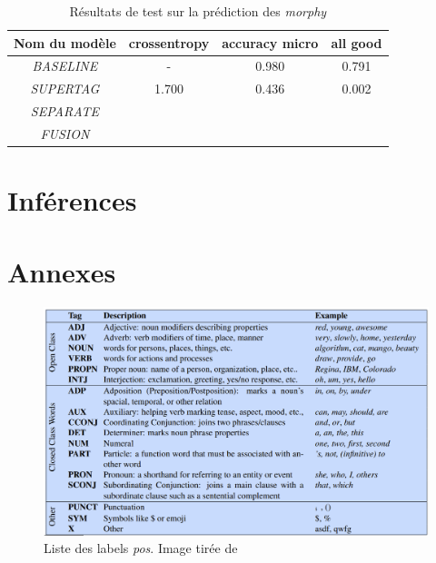 \documentclass[a4paper]{article}
\begin{document}


\begin{table}[H]
    \centering
    \begin{tabular}{|c|c|c|c|}
        \hline
         Nom du modèle & crossentropy & accuracy micro & all good\\
         \hline
         \textit{BASELINE}& - & 0.980 & 0.791 \\
         \hline
         \textit{SUPERTAG}& 1.700 & 0.436 & 0.002\\
         \hline
         \textit{SEPARATE}&  &  & \\
         \hline
         \textit{FUSION}&  &  & \\
         \hline
    \end{tabular}
    \caption{Résultats de test sur la prédiction des \textit{morphy}}
    \label{tab: test morphy}
\end{table}


\section{Inférences}

\newpage

\section{Annexes}
\label{sec: Annexes}

\begin{figure}[H]
    \centering
    \includegraphics[width=\textwidth]{all_pos.png}
    \caption{Liste des labels \textit{pos}. Image tirée de~\cite{pos}}
\end{figure}   

\newpage

\printbibliography
\end{document}
